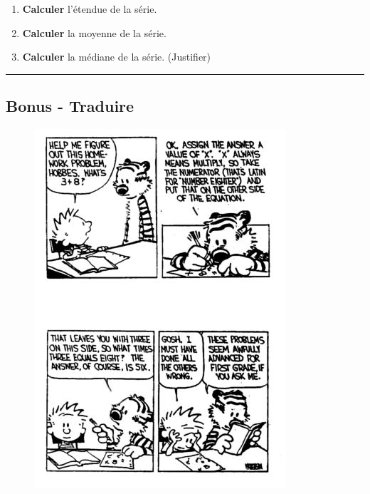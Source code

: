 \documentclass[12pt]{article}
\newcommand{\horrule}[1]{\rule{\linewidth}{#1}} %
\begin{document}
\begin{multicols}{2}
\begin{enumerate}
\item[1.] \textbf{Calculer} l'étendue de la série.
\item[2.] \textbf{Calculer} la moyenne de la série.
\item[3.] \textbf{Calculer} la médiane de la série. (Justifier)
\end{enumerate}

\horrule{1px}
\subsection*{Bonus - Traduire}

\begin{figure}[H]
	\centering
	\includegraphics[width=0.7 \linewidth]{3x1-statistiques/sources/cah.jpg}
\end{figure}
\end{multicols}
\end{document}
